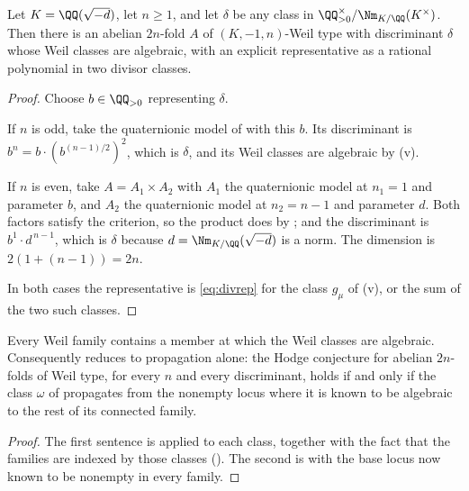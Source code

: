 \begin{theorem}\label{thm:everyfamily}
Let $K=\QQ(\sqrt{-d})$, let $n\ge1$, and let $\delta$ be any class in
$\QQ^{\times}_{>0}/\Nm_{K/\QQ}(K^{\times})$. Then there is an abelian
$2n$-fold $A$ of $(K,-1,n)$-Weil type with discriminant $\delta$ whose Weil
classes are algebraic, with an explicit representative as a rational
polynomial in two divisor classes.
\end{theorem}

\begin{proof}
Choose $b\in\QQ_{>0}$ representing $\delta$.

If $n$ is odd, take the quaternionic model of  with this $b$.
Its discriminant is $b^{n}=b\cdot(b^{(n-1)/2})^{2}$, which is $\delta$, and
its Weil classes are algebraic by (v).

If $n$ is even, take $A=A_{1}\times A_{2}$ with $A_{1}$ the quaternionic model
at $n_{1}=1$ and parameter $b$, and $A_{2}$ the quaternionic model at
$n_{2}=n-1$ and parameter $d$. Both factors satisfy the criterion, so the
product does by ; and the discriminant is
$b^{1}\cdot d^{\,n-1}$, which is $\delta$ because $d=\Nm_{K/\QQ}(\sqrt{-d})$ is
a norm. The dimension is $2(1+(n-1))=2n$.

In both cases the representative is \eqref{eq:divrep} for the class
$g_{\mu}$ of (v), or the sum of the two such classes.
\end{proof}

\begin{corollary}\label{cor:R2}
Every Weil family contains a member at which the Weil classes are algebraic.
Consequently  reduces to propagation alone: the Hodge
conjecture for abelian $2n$-folds of Weil type, for every $n$ and every
discriminant, holds if and only if the class $\omega$ of
 propagates from the nonempty locus where it is known to be
algebraic to the rest of its connected family.
\end{corollary}

\begin{proof}
The first sentence is  applied to each class, together
with the fact that the families are indexed by those classes
(). The second is  with the base locus now
known to be nonempty in every family.
\end{proof}

